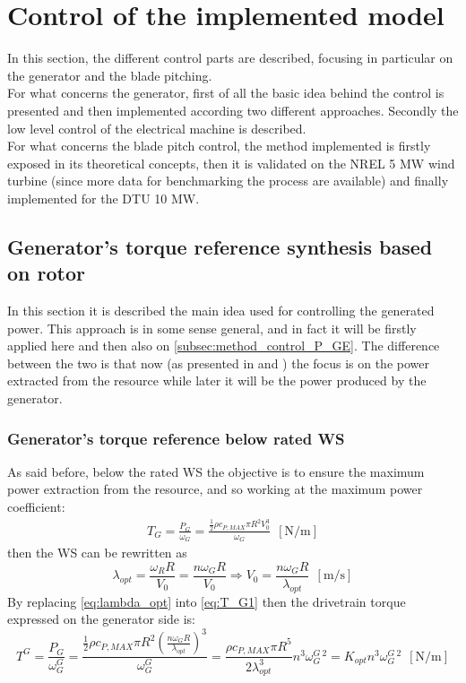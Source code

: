 \newpage
\section{Control of the implemented model}\label{sec:c_basic_model_control}
In this section, the different control parts are described, focusing in particular on the generator and the blade pitching. \\
For what concerns the generator, first of all the basic idea behind the control is presented and then implemented according two different approaches. Secondly the low level control of the electrical machine is described.\\
For what concerns the blade pitch control, the method implemented is firstly exposed in its theoretical concepts, then it is validated on the NREL 5 MW wind turbine (since more data for benchmarking the process are available) and finally implemented for the DTU 10 MW.   

\subsection{Generator's torque reference synthesis based on rotor}\label{subsec:torque_reference}
In this section it is described the main idea used for controlling the generated power. This approach is in some sense general, and in fact it will be firstly applied here and then also on \autoref{subsec:method_control_P_GE}. The difference between the two is that now (as presented in \cite{Aerodynamics_of_wind_turbines} and \cite{SMILDEN2016386}) the focus is on the power extracted from the resource while later it will be the power produced by the generator.

\subsubsection{Generator's torque reference below rated \acrshort{WS}}\label{subsec:below_rotor}
As said before, below the rated WS the objective is to ensure the maximum power extraction from the resource, and so working at the maximum power coefficient:
\begin{gather}
    T_G=\frac{P_G}{\omega_G}=\frac{\frac{1}{2}\rho c_{P,MAX} \pi R^2 V_0^3}{\omega_G} \ \ \left[\si{\newton\per\meter}\right]
    \label{eq:T_G1}
\end{gather}
then the \acrshort{WS} can be rewritten as
\begin{equation}
    \lambda_{opt} = \frac{\omega_R R}{V_0} = \frac{n \omega_G R}{V_0} \Rightarrow V_0=\frac{n\omega_G R}{\lambda_{opt}}  \ \ \left[\si{\meter\per\second}\right]
    \label{eq:lambda_opt}
\end{equation}
By replacing \autoref{eq:lambda_opt} into \autoref{eq:T_G1} then the drivetrain torque expressed on the generator side is:
\begin{equation}
    T^G=\frac{P_G}{\omega_G^G}=\frac{\frac{1}{2}\rho c_{P,MAX} \pi R^2 \left(\frac{n\omega_G R}{\lambda_{opt}}\right)^3}{\omega_G^G} = \frac{\rho c_{P, MAX} \pi R^5 }{2 \lambda_{opt}^3}n^3\omega_G^{G \ 2} = K_{opt}n^3\omega_G^{G \ 2}  \ \ \left[\si{\newton\per\meter}\right]
    \label{eq:T_G2}
\end{equation}


